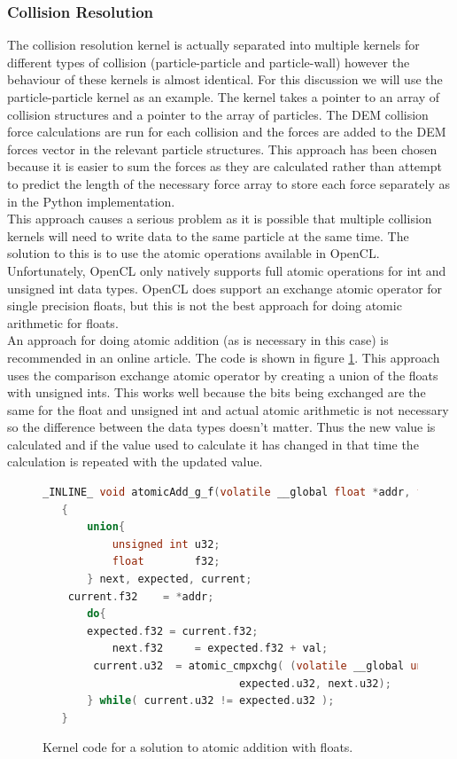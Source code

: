 \documentclass[10pt,a4paper,titlepage]{report}
\begin{document}
\subsubsection{Collision Resolution}
\label{sec:Collision Resolution}
The collision resolution kernel is actually separated into multiple kernels for different types of collision (particle-particle and particle-wall) however the behaviour of these kernels is almost identical. For this discussion we will use the particle-particle kernel as an example. The kernel takes a pointer to an array of collision structures and a pointer to the array of particles. The DEM collision force calculations are run for each collision and the forces are added to the DEM forces vector in the relevant particle structures. This approach has been chosen because it is easier to sum the forces as they are calculated rather than attempt to predict the length of the necessary force array to store each force separately as in the Python implementation.
\\This approach causes a serious problem as it is possible that multiple collision kernels will need to write data to the same particle at the same time. The solution to this is to use the atomic operations available in OpenCL. Unfortunately, OpenCL only natively supports full atomic operations for int and unsigned int data types. OpenCL does support an exchange atomic operator for single precision floats, but this is not the best approach for doing atomic arithmetic for floats.
\\An approach for doing atomic addition (as is necessary in this case) is recommended in an online article\cite{atomic_addition}.
The code is shown in figure \ref{fig:atomic_float_addition}. This approach uses the comparison exchange atomic operator by creating a union of the floats with unsigned ints. This works well because the bits being exchanged are the same for the float and unsigned int and actual atomic arithmetic is not necessary so the difference between the data types doesn't matter. Thus the new value is calculated and if the value used to calculate it has changed in that time the calculation is repeated with the updated value.
\begin{figure}[!ht]
\begin{lstlisting}[language=C]
 _INLINE_ void atomicAdd_g_f(volatile __global float *addr, float val)
   {
       union{
           unsigned int u32;
           float        f32;
       } next, expected, current;
   	current.f32    = *addr;
       do{
   	   expected.f32 = current.f32;
           next.f32     = expected.f32 + val;
   		current.u32  = atomic_cmpxchg( (volatile __global unsigned int *)addr, 
                               expected.u32, next.u32);
       } while( current.u32 != expected.u32 );
   }
\end{lstlisting}
\caption{Kernel code for a solution to atomic addition with floats.}
\label{fig:atomic_float_addition}
\end{figure}
\end{document}

